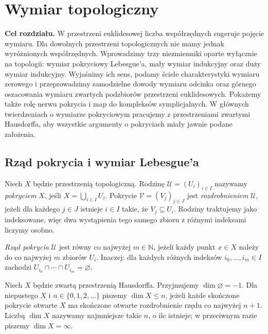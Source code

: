 \chapter{Wymiar topologiczny}
\label{ch:topog23-wymiar}

\providecommand{\atlasref}[2]{#2}

\noindent\textbf{Cel rozdziału.}
W przestrzeni euklidesowej liczba współrzędnych sugeruje
pojęcie wymiaru. Dla dowolnych przestrzeni topologicznych
nie mamy jednak wyróżnionych współrzędnych.
Wprowadzimy trzy niezmienniki oparte wyłącznie na topologii:
wymiar pokryciowy Lebesgue'a, mały wymiar indukcyjny
oraz duży wymiar indukcyjny. Wyjaśnimy ich sens,
podamy ścisłe charakterystyki wymiaru zerowego
i przeprowadzimy samodzielne dowody wymiaru odcinka
oraz górnego oszacowania wymiaru zwartych podzbiorów
przestrzeni euklidesowych. Pokażemy także rolę
nerwu pokrycia i map do kompleksów symplicjalnych.
W głównych twierdzeniach o wymiarze pokryciowym
pracujemy z przestrzeniami zwartymi Hausdorffa,
aby wszystkie argumenty o pokryciach miały jawnie
podane założenia.

\section{Rząd pokrycia i wymiar Lebesgue'a}
\label{sec:topog23-cover}

\begin{definicja}
\label{def:topog23-order}
Niech \(X\) będzie przestrzenią topologiczną.
Rodzinę \(\mathcal U=(U_i)_{i\in I}\) nazywamy
\emph{pokryciem} \(X\), jeśli
\(X=\bigcup_{i\in I}U_i\).
Pokrycie \(\mathcal V=(V_j)_{j\in J}\)
jest \emph{rozdrobnieniem} \(\mathcal U\),
jeżeli dla każdego \(j\in J\) istnieje
\(i\in I\) takie, że \(V_j\subseteq U_i\).
Rodziny traktujemy jako indeksowane,
więc dwa wystąpienia tego samego zbioru
z różnymi indeksami liczymy osobno.

\emph{Rząd pokrycia} \(\mathcal U\)
jest równy co najwyżej \(m\in\mathbb N\),
jeżeli każdy punkt \(x\in X\)
należy do co najwyżej \(m\) zbiorów \(U_i\).
Inaczej: dla każdych różnych indeksów
\(i_0,\ldots,i_m\in I\) zachodzi
\(U_{i_0}\cap\cdots\cap U_{i_m}=\varnothing\).
\end{definicja}

\begin{definicja}
\label{def:topog23-dim}
Niech \(X\) będzie zwartą przestrzenią Hausdorffa.
Przyjmujemy \(\dim\varnothing=-1\).
Dla niepustego \(X\) i \(n\in\{0,1,2,\ldots\}\)
piszemy \(\dim X\le n\), jeżeli
każde skończone pokrycie otwarte \(X\)
ma skończone otwarte rozdrobnienie
rzędu co najwyżej \(n+1\).
Liczbą \(\dim X\) nazywamy najmniejsze
takie \(n\), o ile istnieje;
w przeciwnym razie piszemy \(\dim X=\infty\).
\end{definicja}


